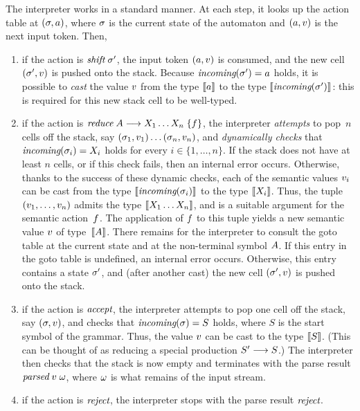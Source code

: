 \documentclass{llncs}
\begin{document}
The interpreter works in a standard manner. At each step, it looks up the
action table at $(\sigma,a)$, where $\sigma$ is the current state of the
automaton and $(a,v)$ is the next input token.
Then,
\begin{enumerate}
\item if the action is $\textit{shift}\;\sigma'$,
      the input token $(a,v)$ is consumed, and
      the new cell $(\sigma',v)$ is pushed onto the stack.
      Because $\textit{incoming}(\sigma')=a$ holds, it is possible to
      \emph{cast} the value $v$ from the
      type $\llbracket a\rrbracket$ to the type $\llbracket\textit{incoming}(\sigma')\rrbracket$: this is required
      for this new stack cell to be well-typed.
\item if the action is $\textit{reduce}\;A\longrightarrow X_1\ldots X_n\;\{f\}$, the interpreter
      \emph{attempts} to pop~$n$ cells off the stack, say $(\sigma_1,v_1)\ldots(\sigma_n,v_n)$, and
      \emph{dynamically checks} that $\textit{incoming}(\sigma_i)=X_i$ holds for every $i\in\{1,\ldots,n\}$. If
      the stack does not have at least $n$ cells, or if this check fails,
      then an internal error occurs. Otherwise, thanks to the
      success of these dynamic checks, each of the semantic values $v_i$
      can be cast from the type $\llbracket\textit{incoming}(\sigma_i)\rrbracket$ to the
      type $\llbracket X_i\rrbracket$. Thus, the tuple $(v_1,\ldots,v_n)$ admits
      the type $\llbracket X_1\ldots X_n\rrbracket$, and is a suitable argument for
      the semantic action~$f$. The application of $f$ to this tuple
      yields a new semantic value $v$ of type~$\llbracket A\rrbracket$. There
      remains for the interpreter to consult the goto table at the current state and at
      the non-terminal symbol $A$. If this entry in the goto
      table is undefined, an internal error occurs. Otherwise, this entry
      contains a state $\sigma'$, and (after another cast) the new cell
      $(\sigma',v)$ is pushed onto the stack.
\item if the action is $\textit{accept}$, the interpreter attempts to pop one cell off
      the stack, say $(\sigma,v)$, and checks that $\textit{incoming}(\sigma)=S$ holds,
      where $S$ is the start symbol of the grammar. Thus, the value $v$
      can be cast to the type $\llbracket S\rrbracket$. (This can be thought of as
      reducing a special production $S'\longrightarrow S$.) The
      interpreter then checks that the stack is now empty
      and terminates with the parse result $\textit{parsed}\;v\;\omega$,
      where $\omega$ is what remains of the input stream.
\item if the action is $\textit{reject}$, the interpreter stops
      with the parse result $\textit{reject}$.
\end{enumerate}
\end{document}
